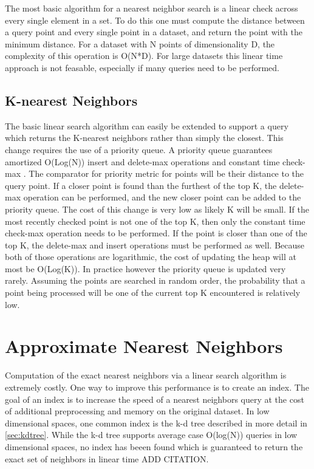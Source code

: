 The most basic algorithm for a nearest neighbor search is a linear check across every single element in a set.  To do this one must compute the distance between a query point and every single point in a dataset, and return the point with the minimum distance.  For a dataset with N points of dimensionality D, the complexity of this operation is O(N*D).  For large datasets this linear time approach is not feasable, especially if many queries need to be performed.

\subsection{K-nearest Neighbors}
\label{subsec:knn}

The basic linear search algorithm can easily be extended to support a query which returns the K-nearest neighbors rather than simply the closest.  This change requires the use of a priority queue.  A priority queue guarantees amortized O(Log(N)) insert and delete-max operations and constant time check-max \citep{van1976design}.  The comparator for priority metric for points will be their distance to the query point.  If a closer point is found than the furthest of the top K, the delete-max operation can be performed, and the new closer point can be added to the priority queue.  The cost of this change is very low as likely K will be small.  If the most recently checked point is not one of the top K, then only the constant time check-max operation needs to be performed.  If the point is closer than one of the top K, the delete-max and insert operations must be performed as well.  Because both of those operations are logarithmic, the cost of updating the heap will at most be O(Log(K)).  In practice however the priority queue is updated very rarely.  Assuming the points are searched in random order, the probability that a point being processed will be one of the current top K encountered is relatively low.




\section{Approximate Nearest Neighbors}

Computation of the exact nearest neighbors via a linear search algorithm is extremely costly.  One way to improve this performance is to create an index.  The goal of an index is to increase the speed of a nearest neighbors query at the cost of additional preprocessing and memory on the original dataset.  In low dimensional spaces, one common index is the k-d tree described in more detail in \ref{sec:kdtree}.  While the k-d tree supports average case O(log(N)) queries in low dimensional spaces, no index has beeen found which is guaranteed to return the exact set of neighbors in linear time ADD CITATION.


